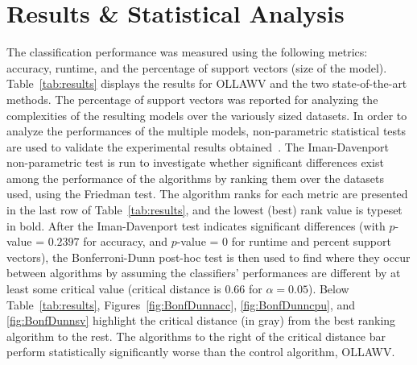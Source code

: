 \documentclass[reqno]{vcuthesis}
\numberwithin{equation}{chapter}
\begin{document}
\section{Results \& Statistical Analysis}\label{subsec:ollawvexpsvm}
The classification performance was measured using the following metrics: accuracy, runtime, and the percentage of support vectors (size of the model). Table~\ref{tab:results} displays the results for OLLAWV and the two state-of-the-art methods. The percentage of support vectors was reported for analyzing the complexities of the resulting models over the variously sized datasets. In order to analyze the performances of the multiple models, non-parametric statistical tests are used to validate the experimental results obtained~\cite{Derrac2011}. The Iman-Davenport non-parametric test is run to investigate whether significant differences exist among the performance of the algorithms by ranking them over the datasets used, using the Friedman test. The algorithm ranks for each metric are presented in the last row of Table~\ref{tab:results}, and the lowest (best) rank value is typeset in bold. After the Iman-Davenport test indicates significant differences (with $p$-value = $0.2397$ for accuracy, and $p$-value = $0$ for runtime and percent support vectors), the Bonferroni-Dunn post-hoc test is then used to find where they occur between algorithms by assuming the classifiers' performances are different by at least some critical value (critical distance is $0.66$ for $\alpha = 0.05$). Below Table~\ref{tab:results}, Figures~\ref{fig:BonfDunnacc}, \ref{fig:BonfDunncpu}, and \ref{fig:BonfDunnsv} highlight the critical distance (in gray) from the best ranking algorithm to the rest. The algorithms to the right of the critical distance bar perform statistically significantly worse than the control algorithm, OLLAWV.
\end{document}
